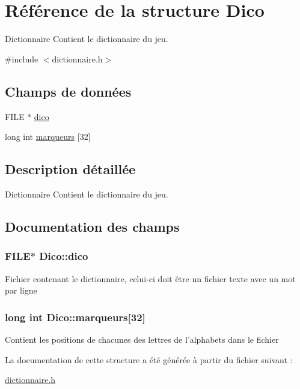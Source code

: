 \hypertarget{structDico}{\section{Référence de la structure Dico}
\label{structDico}
}


Dictionnaire Contient le dictionnaire du jeu.  




{\ttfamily \#include $<$dictionnaire.\-h$>$}

\subsection*{Champs de données}
\begin{DoxyCompactItemize}
\item 
F\-I\-L\-E $\ast$ \hyperlink{structDico_aa608808df162aebf2b2bfbc4723cfad6}{dico}
\item 
long int \hyperlink{structDico_a1a8a33881f938f4ddd946edc97ae82f8}{marqueurs} \mbox{[}32\mbox{]}
\end{DoxyCompactItemize}


\subsection{Description détaillée}
Dictionnaire Contient le dictionnaire du jeu. 

\subsection{Documentation des champs}
\hypertarget{structDico_aa608808df162aebf2b2bfbc4723cfad6}{
\subsubsection[{dico}]{\setlength{\rightskip}{0pt plus 5cm}F\-I\-L\-E$\ast$ Dico\-::dico}}\label{structDico_aa608808df162aebf2b2bfbc4723cfad6}
Fichier contenant le dictionnaire, celui-\/ci doit être un fichier texte avec un mot par ligne \hypertarget{structDico_a1a8a33881f938f4ddd946edc97ae82f8}{
\subsubsection[{marqueurs}]{\setlength{\rightskip}{0pt plus 5cm}long int Dico\-::marqueurs\mbox{[}32\mbox{]}}}\label{structDico_a1a8a33881f938f4ddd946edc97ae82f8}
Contient les positions de chacunes des lettres de l'alphabets dans le fichier 

La documentation de cette structure a été générée à partir du fichier suivant \-:\begin{DoxyCompactItemize}
\item 
\hyperlink{dictionnaire_8h}{dictionnaire.\-h}\end{DoxyCompactItemize}
